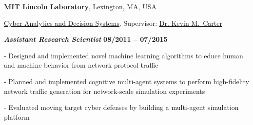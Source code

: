 \documentclass[10pt]{article}
\begin{document}
\href{http://www.ll.mit.edu/}{\textbf{MIT Lincoln Laboratory}},
Lexington, MA, USA

\href{https://www.ll.mit.edu/mission/cybersec/CADS/CADS.html}
{Cyber Analytics and Decision Systems}.
Supervisor:
\href{https://www.ll.mit.edu/mission/cybersec/cybersec-bios/carter-bio.html}
{Dr. Kevin M.~Carter}

\vspace{-0.5em}

\begin{outerlist}

\item[] {\normalsize \textbf{\textit{Assistant Research Scientist}}}%
\hfill \textbf{08/2011 -- 07/2015}

\begin{innerlist}

\item[-] Designed and implemented novel machine learning algorithms to educe human and machine behavior from network protocol traffic

\item[-] Planned and implemented cognitive multi-agent systems to perform high-fidelity network traffic generation for network-scale simulation experiments

\item[-] Evaluated moving target cyber defenses by building a multi-agent simulation platform

%
%
%

%
%

\end{innerlist}
\end{outerlist}
\end{document}

